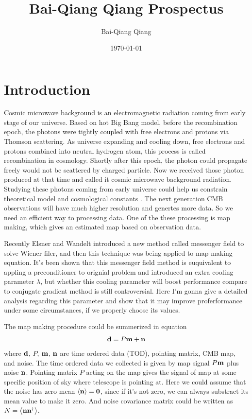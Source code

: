 \documentclass[11pt, letterpaper]{article}
\title{Bai-Qiang Qiang Prospectus}
\author{Bai-Qiang Qiang}
\date{\today}
\newcommand{\vbd}{\vb{d}}
\newcommand{\vbm}{\vb{m}}
\newcommand{\vbn}{\vb{n}}
\begin{document}
\maketitle

\section{Introduction}
Cosmic microwave background is an electromagnetic radiation coming from early
stage of our universe. Based on hot Big Bang model, before the recombination
epoch, the photons were tightly coupled with free electrons and protons via 
Thomson scattering. As universe expanding and cooling down, free electrons and
protons combined into neutral hydrogen atom, this process is called 
recombination in cosmology. Shortly after this epoch, the photon could
propagate freely would not be scattered by charged particle. Now we received 
those photon produced at that time and called it cosmic microwave background
radiation. Studying these photons coming from early universe could help us
constrain theoretical model and cosmological constants
\cite{10.1093/ptep/ptaa104}.
The next generation CMB observations will have much higher resolution and 
genertes more data.
So we need an efficient way to processing data.
One of the these processing is map making, which gives an estimated map based 
on observation data.

Recently Elsner and Wandelt\cite{2013A&A...549A.111E} introduced a new
method called messenger field to solve Wiener filer, and then this technique
was being applied to map making equation\cite{Huffenberger_2018}.
It's been shown that this messenger field method is euquivalent to appling a
preconditioner to orignial problem and introduced an extra cooling parameter
$\lambda$, but whether this cooling parameter will boost performance compare to
conjugate gradient method is still controversial\cite{2018A&A...620A..59P}.
Here I'm gonna give a detailed analysis regarding this parameter and show that
it may improve proferformance under some circumstances, if we properly choose
its values.

The map making procedure could be summerized in equation
\begin{equation}
\vbd = P\vbm + \vbn \label{map making model}
\end{equation}
where $\vbd$, $P$, $\vbm$, $\vbn$ are time ordered data (TOD), pointing matrix,
CMB map, and noise.
The time ordered data we collected is given by map signal $P\vbm$ plus noise 
$\vbn$.
Pointing matrix $P$ acting on the map gives the signal of map at some specific 
position of sky where telescope is pointing at.
Here we could assume that the noise has zero mean $\ev{\vbn} = \vb{0}$,
since if it's not zero, we can always substract its mean value to make it zero.
And noise covariance matrix could be written as $N = \ev{\vbn \vbn^{\dagger}}$.
\end{document}
